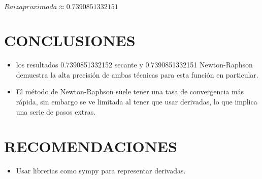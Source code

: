 \documentclass[12pt]{article}
\begin{document}
\(Raiz aproximada \approx 0.7390851332151 \)
\section*{CONCLUSIONES}
\begin{itemize}
    \item {los resultados 0.7390851332152 secante y 0.7390851332151 Newton-Raphson demuestra la alta precisión de ambas técnicas para esta función en particular.}
    \item {El método de Newton-Raphson suele tener una tasa de convergencia más rápida, sin embargo se ve limitada al tener que usar derivadas, lo que implica una serie de pasos extras.} 
\end{itemize}

\section*{RECOMENDACIONES}

\begin{itemize}
    \item Usar librerias como sympy para representar derivadas.
\end{itemize}

\renewcommand{\refname}{\MakeUppercase{REFERENCIAS}}


\end{document}
